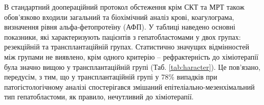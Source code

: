 \begin{table}[]
\centering
\caption{Розподілення пацієнтів по стадії PRETEXT }
\label{tab:pretexpvfc}
\end{table}

В стандартний доопераційний протокол обстеження крім СКТ та МРТ також обов’язково входили загальний та біохімічний аналіз крові, коагулограма, визначення рівня альфа-фетопротеїну (АФП). У таблиці наведено основні показники, які характеризують пацієнтів  з гепатобластомами у двох групах: резекційній та трансплантаційній групах. Статистично значущих відмінностей між групами не виявлено, крім одного критерію – рефрактерність до хіміотерапії була значно вищою у трансплантаційній групі (Таб. \ref{tab:haracter}). Це пов’язано, передусім, з тим, що у трансплантаційній групі у 78\% випадків при патогістологічному аналізі спостерігався змішаний епітеліально-мезенхімальний тип гепатобластоми, як правило, нечутливий до хіміотерапії. 


